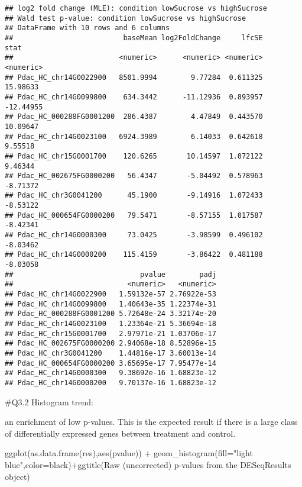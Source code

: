 \documentclass[
]{article}
\newenvironment{Shaded}{\begin{snugshade}}{\end{snugshade}}
\newcommand{\AttributeTok}[1]{\textcolor[rgb]{0.77,0.63,0.00}{#1}}
\newcommand{\FunctionTok}[1]{\textcolor[rgb]{0.00,0.00,0.00}{#1}}
\newcommand{\NormalTok}[1]{#1}
\newcommand{\SpecialCharTok}[1]{\textcolor[rgb]{0.00,0.00,0.00}{#1}}
\newcommand{\StringTok}[1]{\textcolor[rgb]{0.31,0.60,0.02}{#1}}
\begin{document}
\begin{verbatim}
## log2 fold change (MLE): condition lowSucrose vs highSucrose 
## Wald test p-value: condition lowSucrose vs highSucrose 
## DataFrame with 10 rows and 6 columns
##                          baseMean log2FoldChange     lfcSE      stat
##                         <numeric>      <numeric> <numeric> <numeric>
## Pdac_HC_chr14G0022900   8501.9994        9.77284  0.611325  15.98633
## Pdac_HC_chr14G0099800    634.3442      -11.12936  0.893957 -12.44955
## Pdac_HC_000288FG0001200  286.4387        4.47849  0.443570  10.09647
## Pdac_HC_chr14G0023100   6924.3989        6.14033  0.642618   9.55518
## Pdac_HC_chr15G0001700    120.6265       10.14597  1.072122   9.46344
## Pdac_HC_002675FG0000200   56.4347       -5.04492  0.578963  -8.71372
## Pdac_HC_chr3G0041200      45.1900       -9.14916  1.072433  -8.53122
## Pdac_HC_000654FG0000200   79.5471       -8.57155  1.017587  -8.42341
## Pdac_HC_chr14G0000300     73.0425       -3.98599  0.496102  -8.03462
## Pdac_HC_chr14G0000200    115.4159       -3.86422  0.481188  -8.03058
##                              pvalue        padj
##                           <numeric>   <numeric>
## Pdac_HC_chr14G0022900   1.59132e-57 2.76922e-53
## Pdac_HC_chr14G0099800   1.40643e-35 1.22374e-31
## Pdac_HC_000288FG0001200 5.72648e-24 3.32174e-20
## Pdac_HC_chr14G0023100   1.23364e-21 5.36694e-18
## Pdac_HC_chr15G0001700   2.97971e-21 1.03706e-17
## Pdac_HC_002675FG0000200 2.94068e-18 8.52896e-15
## Pdac_HC_chr3G0041200    1.44816e-17 3.60013e-14
## Pdac_HC_000654FG0000200 3.65695e-17 7.95477e-14
## Pdac_HC_chr14G0000300   9.38692e-16 1.68823e-12
## Pdac_HC_chr14G0000200   9.70137e-16 1.68823e-12
\end{verbatim}

\#Q3.2 Histogram trend:

an enrichment of low p-values. This is the expected result if there is a
large class of differentially expressed genes between treatment and
control.

\begin{Shaded}
\begin{Highlighting}[]
\FunctionTok{ggplot}\NormalTok{(}\FunctionTok{as.data.frame}\NormalTok{(res),}\FunctionTok{aes}\NormalTok{(pvalue)) }\SpecialCharTok{+} \FunctionTok{geom\_histogram}\NormalTok{(}\AttributeTok{fill=}\StringTok{"light blue"}\NormalTok{,}\AttributeTok{color=}\StringTok{\textquotesingle{}black\textquotesingle{}}\NormalTok{)}\SpecialCharTok{+}\FunctionTok{ggtitle}\NormalTok{(}\StringTok{\textquotesingle{}Raw (uncorrected) p{-}values from the DESeqResults object\textquotesingle{}}\NormalTok{)}
\end{Highlighting}
\end{Shaded}
\end{document}
